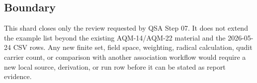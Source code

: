 \subsection{Boundary}

This shard closes only the review requested by QSA Step 07.  It does not
extend the example list beyond the existing AQM-14/AQM-22 material and the
2026-05-24 CSV rows.  Any new finite set, field space, weighting, radical
calculation, qudit carrier count, or comparison with another association
workflow would require a new local source, derivation, or run row before it
can be stated as report evidence.
